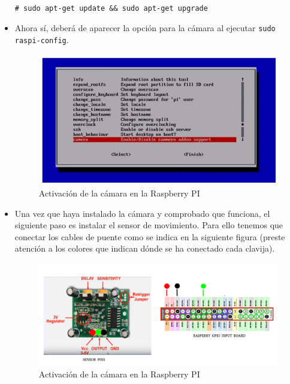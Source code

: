 \begin{itemize}
\begin{verbatim}

# sudo apt-get update && sudo apt-get upgrade

\end{verbatim}

\vspace{-1cm}

\item Ahora sí, deberá de aparecer la opción para la cámara al ejecutar \texttt{sudo raspi-config}.

\begin{figure}[H]
	\centering
	\includegraphics[scale=0.9]{images/47}
	\caption{Activación de la cámara en la Raspberry PI}
\end{figure}

\vspace{-0.4cm}

\item Una vez que haya instalado la cámara y comprobado que funciona, el siguiente paso es instalar el sensor de movimiento. Para ello tenemos que conectar los cables de puente como se indica en la siguiente figura (preste atención a los colores que indican dónde se ha conectado cada clavija).

\begin{figure}[H]
	\centering
	\includegraphics[scale=0.37]{images/48}
	\caption{Activación de la cámara en la Raspberry PI}
\end{figure}


\end{itemize}

